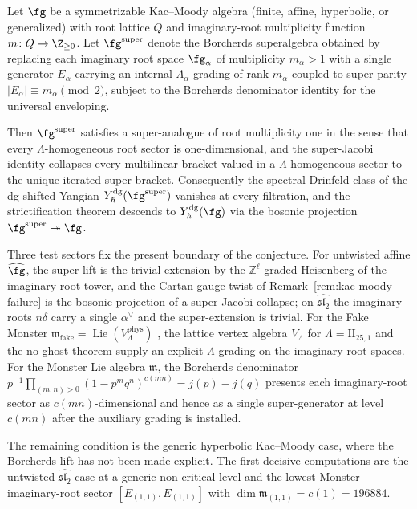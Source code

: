 \begin{remark}
\begin{conjecture}
\label{conj:kac-moody-strictification-borcherds}
Let $\fg$ be a symmetrizable Kac--Moody algebra (finite, affine,
hyperbolic, or generalized) with root lattice $Q$ and imaginary-root
multiplicity function $m\colon Q\to\Z_{\ge 0}$. Let
$\fg^{\mathrm{super}}$ denote the Borcherds superalgebra obtained by
replacing each imaginary root space $\fg_\alpha$ of multiplicity
$m_\alpha>1$ with a single generator $E_\alpha$ carrying an internal
$\Lambda_\alpha$-grading of rank $m_\alpha$ coupled to super-parity
$|E_\alpha|\equiv m_\alpha\pmod 2$, subject to the Borcherds denominator
identity for the universal enveloping.

Then $\fg^{\mathrm{super}}$ satisfies a super-analogue of root
multiplicity one in the sense that every $\Lambda$-homogeneous root
sector is one-dimensional, and the super-Jacobi identity collapses
every multilinear bracket valued in a $\Lambda$-homogeneous sector to
the unique iterated super-bracket. Consequently the spectral Drinfeld
class of the dg-shifted Yangian $Y^{\mathrm{dg}}_\hbar(\fg^{\mathrm{super}})$
vanishes at every filtration, and the strictification theorem
descends to $Y^{\mathrm{dg}}_\hbar(\fg)$ via the bosonic projection
$\fg^{\mathrm{super}}\twoheadrightarrow\fg$.
\end{conjecture}

Three test sectors fix the present boundary of the conjecture.
For untwisted affine $\widehat\fg$, the super-lift is the trivial
extension by the $\mathbb{Z}^\ell$-graded Heisenberg of the
imaginary-root tower, and the Cartan gauge-twist of
Remark~\ref{rem:kac-moody-failure} is the bosonic projection of a
super-Jacobi collapse; on $\widehat{\mathfrak{sl}_2}$ the imaginary
roots $n\delta$ carry a single $\alpha^\vee$ and the super-extension is
trivial. For the Fake Monster
$\mathfrak{m}_{\mathrm{fake}}=\operatorname{Lie}(V_\Lambda^{\mathrm{phys}})$
\cite{Borcherds1990}, the lattice vertex algebra $V_\Lambda$ for
$\Lambda=\mathrm{II}_{25,1}$ and the no-ghost theorem supply an
explicit $\Lambda$-grading on the imaginary-root spaces. For the
Monster Lie algebra $\mathfrak{m}$, the Borcherds denominator
$p^{-1}\prod_{(m,n)>0}(1-p^m q^n)^{c(mn)}=j(p)-j(q)$
\cite{Borcherds1992} presents each imaginary-root sector as
$c(mn)$-dimensional and hence as a single super-generator at level
$c(mn)$ after the auxiliary grading is installed.

The remaining condition is the generic hyperbolic
Kac--Moody case, where the Borcherds lift has not been made explicit.
The first decisive computations are the untwisted
$\widehat{\mathfrak{sl}_2}$ case at a generic non-critical level and
the lowest Monster imaginary-root sector
$[E_{(1,1)},E_{(1,1)}]$ with
$\dim\mathfrak{m}_{(1,1)}=c(1)=196884$.
\end{remark}

